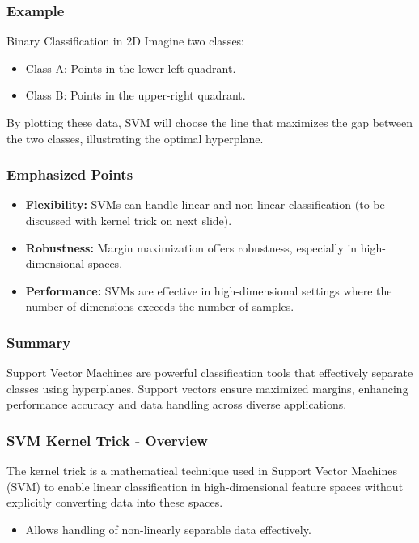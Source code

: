 \documentclass[aspectratio=169]{beamer}
\begin{document}
\begin{frame}[fragile]
    \frametitle{Example}
    \begin{block}{Binary Classification in 2D}
        Imagine two classes:
        \begin{itemize}
            \item Class A: Points in the lower-left quadrant.
            \item Class B: Points in the upper-right quadrant.
        \end{itemize}
        By plotting these data, SVM will choose the line that maximizes the gap between the two classes, illustrating the optimal hyperplane.
    \end{block}
\end{frame}

\begin{frame}[fragile]
    \frametitle{Emphasized Points}
    \begin{itemize}
        \item \textbf{Flexibility:} SVMs can handle linear and non-linear classification (to be discussed with kernel trick on next slide).
        \item \textbf{Robustness:} Margin maximization offers robustness, especially in high-dimensional spaces.
        \item \textbf{Performance:} SVMs are effective in high-dimensional settings where the number of dimensions exceeds the number of samples.
    \end{itemize}
\end{frame}

\begin{frame}[fragile]
    \frametitle{Summary}
    \begin{block}{}
        Support Vector Machines are powerful classification tools that effectively separate classes using hyperplanes. Support vectors ensure maximized margins, enhancing performance accuracy and data handling across diverse applications.
    \end{block}
\end{frame}

\begin{frame}[fragile]
    \frametitle{SVM Kernel Trick - Overview}
    The kernel trick is a mathematical technique used in Support Vector Machines (SVM) to enable linear classification in high-dimensional feature spaces without explicitly converting data into these spaces. 
    \begin{itemize}
        \item Allows handling of non-linearly separable data effectively.
    \end{itemize}
\end{frame}
\end{document}
